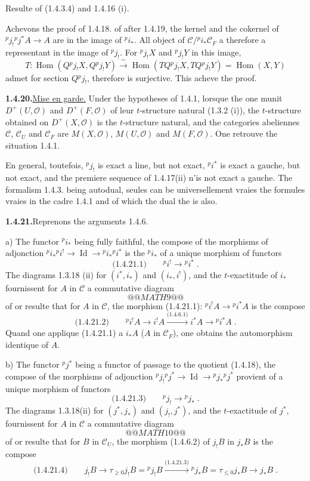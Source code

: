 \documentclass[12pt,a4paper]{article}
\theoremstyle{plain}
\theoremstyle{definition}
\DeclareMathOperator{\Hom}{Hom}
\DeclareMathOperator{\Id}{Id}
\begin{document}
Resulte of (1.4.3.4) and 1.4.16 (i).

Achevons the proof of 1.4.18. of after 1.4.19, the kernel and the cokernel of ${}^p j_! {}^p j^* A \to A$ are in the image of ${}^p i_*$. All object of $\mathcal{C}/{}^p i_* \mathcal{C}_F$ a therefore a representant in the image of ${}^p j_!$. For ${}^p j_! X$ and ${}^p j_! Y$ in this image,
\[
T : \Hom(Q {}^p j_! X, Q {}^p j_! Y) \xrightarrow{\;\sim\;} \Hom(T Q {}^p j_! X, T Q {}^p j_! Y) = \Hom(X,Y)
\]
admet for section $Q {}^p j_!$, therefore is surjective. This acheve the proof.

\smallskip
\noindent\textbf{1.4.20.}\quad \underline{Mise en garde.} Under the hypotheses of 1.4.1, lorsque the one munit $D^+(U, \mathcal{O})$ and $D^+(F, \mathcal{O})$ of leur $t$-structure natural (1.3.2 (i)), the $t$-structure obtained on $D^+(X, \mathcal{O})$ is the $t$-structure natural, and the categories abeliennes $\mathcal{C}$, $\mathcal{C}_U$ and $\mathcal{C}_F$ are $M(X, \mathcal{O})$, $M(U, \mathcal{O})$ and $M(F, \mathcal{O})$. One retrouve the situation 1.4.1.

En general, toutefois, ${}^p j_!$ is exact a line, but not exact, ${}^p i^*$ is exact a gauche, but not exact, and the premiere sequence of 1.4.17(ii) n'is not exact a gauche. The formalism 1.4.3. being autodual, seules can be universellement vraies the formules vraies in the cadre 1.4.1 and of which the dual the is also.

\smallskip
\noindent\textbf{1.4.21.}\quad Reprenons the arguments 1.4.6.

a) The functor ${}^p i_*$ being fully faithful, the compose of the morphisms of adjonction ${}^p i_* {}^p i^! \to \Id \to {}^p i_* {}^p i^*$ is the ${}^p i_*$ of a unique morphism of functors
\[
\text{(1.4.21.1)}\qquad {}^p i^! \longrightarrow {}^p i^*\;.
\]
The diagrams 1.3.18 (ii) for $(i^*, i_*)$ and $(i_*, i^!)$, and the $t$-exactitude of $i_*$ fournissent for $A$ in $\mathcal{C}$ a commutative diagram
\[
@@MATH9@@
\]
of or resulte that for $A$ in $\mathcal{C}$, the morphism (1.4.21.1): ${}^p i^! A \to {}^p i^* A$ is the compose
\[
\text{(1.4.21.2)}\qquad {}^p i^! A \to i^! A \xrightarrow{\text{(1.4.6.1)}} i^* A \to {}^p i^* A\;.
\]
Quand one applique (1.4.21.1) a $i_* A$ ($A$ in $\mathcal{C}_F$), one obtains the automorphism identique of $A$.

b) The functor ${}^p j^*$ being a functor of passage to the quotient (1.4.18), the compose of the morphisms of adjonction ${}^p j_! {}^p j^* \to \Id \to {}^p j_* {}^p j^*$ provient of a unique morphism of functors
\[
\text{(1.4.21.3)}\qquad {}^p j_! \longrightarrow {}^p j_*\;.
\]
The diagrams 1.3.18(ii) for $(j^*, j_*)$ and $(j_!, j^*)$, and the $t$-exactitude of $j^*$, fournissent for $A$ in $\mathcal{C}$ a commutative diagram
\[
@@MATH10@@
\]
of or resulte that for $B$ in $\mathcal{C}_U$, the morphism (1.4.6.2) of $j_! B$ in $j_* B$ is the compose
\[
\text{(1.4.21.4)}\qquad j_! B \longrightarrow \tau_{\geqslant 0} j_! B = {}^p j_! B \xrightarrow{\text{(1.4.21.3)}} {}^p j_* B = \tau_{\leqslant 0} j_* B \longrightarrow j_* B\;.
\]
\end{document}
